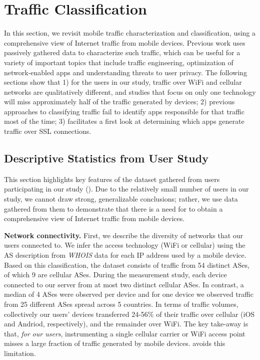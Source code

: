 \section{Traffic Classification}
\label{sec:classification-methodology}

In this section, we revisit mobile traffic characterization and classification, using a comprehensive 
view of Internet traffic from mobile devices. Previous work uses passively gathered data 
to characterize such traffic, which can be useful for a variety of important topics that include 
traffic engineering, optimization of network-enabled apps and understanding threats to user privacy. 
The following sections show that 1) for the users in our study, traffic over WiFi and cellular networks 
are qualitatively different, and studies that focus on only one technology will miss approximately 
half of the traffic generated by devices; 2) previous approaches to classifying traffic fail to identify
apps responsible for that traffic most of the time; 3) \platname{} facilitates a first look at 
determining which apps generate traffic over SSL connections.

\subsection{Descriptive Statistics from User Study}

This section highlights key features of the dataset gathered from 
users participating in our study (\mobWild). 
Due to the relatively small number of users in our study, we cannot 
draw strong, generalizable conclusions; rather, we use data gathered 
from them to demonstrate that there is a need for \platname{} to 
obtain a comprehensive view of Internet traffic from mobile devices. 

\noindent\textbf{Network connectivity.} First, we describe the diversity 
of networks that our users connected to. 
We infer the access technology (WiFi or cellular) using the AS description from \emph{WHOIS} data for each IP address used by a mobile device.
Based on this classification, the \mobWild dataset consists of traffic from 54 distinct ASes, of which 9 are cellular ASes.
During the measurement study, each device connected to our \platname server from at most two distinct cellular ASes. 
In contrast, a median of 4 \wifi ASes were observed per device and for one device we observed traffic from 25 different \wifi ASes spread across 5 countries.
In terms of traffic volumes, collectively our users' devices transferred 24-56\% of their traffic over cellular (iOS and Andriod, respectively), and the 
remainder over WiFi. 
The key take-away is that, \emph{for our users}, instrumenting a single cellular carrier or WiFi access point misses a 
large fraction of traffic generated by mobile devices. \platname{} avoids this limitation.

